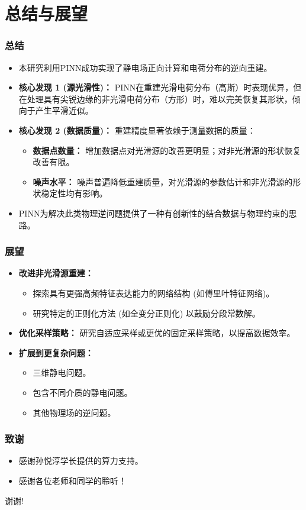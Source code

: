 \documentclass[aspectratio=169]{ctexbeamer}
\begin{document}
\section{总结与展望}
\begin{frame}
  \frametitle{总结}
  \begin{itemize}
    \item 本研究利用PINN成功实现了静电场正向计算和电荷分布的逆向重建。
    \pause
    \item \textbf{核心发现 1 (源光滑性)：} PINN在重建光滑电荷分布（高斯）时表现优异，但在处理具有尖锐边缘的非光滑电荷分布（方形）时，难以完美恢复其形状，倾向于产生平滑近似。
    \pause
    \item \textbf{核心发现 2 (数据质量)：} 重建精度显著依赖于测量数据的质量：
        \begin{itemize}
            \item \textbf{数据点数量：} 增加数据点对光滑源的改善更明显；对非光滑源的形状恢复改善有限。
            \item \textbf{噪声水平：} 噪声普遍降低重建质量，对光滑源的参数估计和非光滑源的形状稳定性均有影响。
        \end{itemize}
    \pause
    \item PINN为解决此类物理逆问题提供了一种有创新性的结合数据与物理约束的思路。
  \end{itemize}
\end{frame}

\begin{frame}
  \frametitle{展望}
    \begin{itemize}
        \item \textbf{改进非光滑源重建：}
            \begin{itemize}
                \item 探索具有更强高频特征表达能力的网络结构 (如傅里叶特征网络)。
                \item 研究特定的正则化方法 (如全变分正则化) 以鼓励分段常数解。
            \end{itemize}
        \item \textbf{优化采样策略：} 研究自适应采样或更优的固定采样策略，以提高数据效率。
        \item \textbf{扩展到更复杂问题：}
            \begin{itemize}
                \item 三维静电问题。
                \item 包含不同介质的静电问题。
                \item 其他物理场的逆问题。
            \end{itemize}
    \end{itemize}
\end{frame}

\begin{frame}
  \frametitle{致谢}
  \begin{itemize}
    \item 感谢孙悦淳学长提供的算力支持。
    \item 感谢各位老师和同学的聆听！
  \end{itemize}
  \vfill
  \centerline{\LARGE 谢谢!}
\end{frame}
\end{document}
